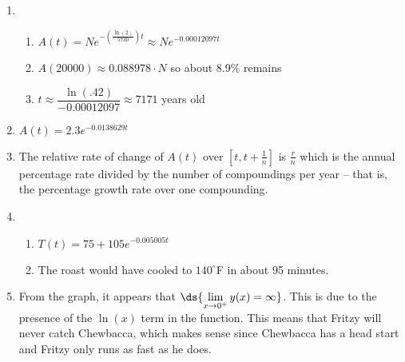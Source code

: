 \documentclass{ximera}
\begin{document}
\begin{enumerate}
\begin{enumerate}
\begin{multicols}{6}
\begin{itemize}
\item $\approx 2.500$

\item $\approx 2.498$

\item$\approx 2.487$

\end{itemize}

\end{multicols}

\end{enumerate}


\item \begin{enumerate}

\item $A(t) = Ne^{-\left(\frac{\ln(2)}{5730}\right)t} \approx Ne^{-0.00012097t}$
\item $A(20000) \approx 0.088978 \cdot N$ so about 8.9\% remains
\item $t \approx \dfrac{\ln(.42)}{-0.00012097} \approx 7171$ years old

\end{enumerate}

\item $A(t) = 2.3e^{-0.0138629t}$

\item  The relative rate of change of $A(t)$ over $\left[t, t+\frac{1}{n} \right]$ is $\frac{r}{n}$ which is the annual percentage rate divided by the number of compoundings per year -- that is,  the percentage growth rate over one compounding.

\addtocounter{enumi}{1}

\item \begin{enumerate}

\item $T(t) = 75 + 105e^{-0.005005t}$

\item The roast would have cooled to $140^{\circ}$F in about 95 minutes.

\end{enumerate}

\item From the graph, it appears that $\ds{\lim_{x \rightarrow 0^{+}} y(x) = \infty}$.  This is due to the presence of the $\ln(x)$ term in the function.  This means that Fritzy will never catch Chewbacca, which makes sense since Chewbacca has a head start and Fritzy only runs as fast as he does.


\end{enumerate}
\end{document}
